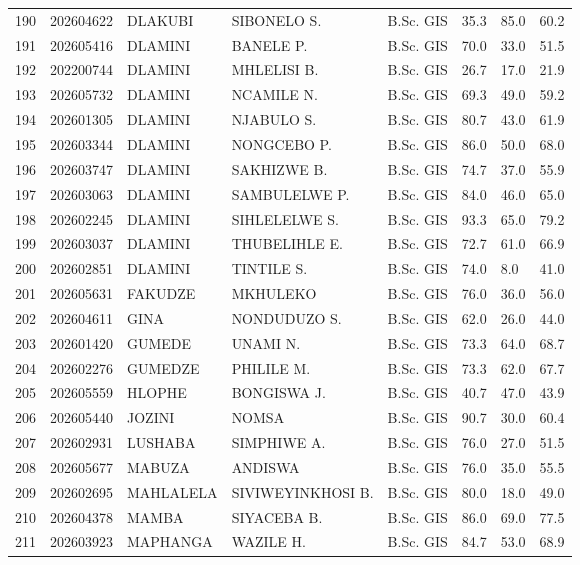 \documentclass[12pt]{article}
\begin{document}
\begin{longtable}{@{}llllllll@{}}
190 & 202604622 & DLAKUBI & SIBONELO S. & B.Sc. GIS & 35.3 & 85.0 & 60.2 \\
191 & 202605416 & DLAMINI & BANELE P. & B.Sc. GIS & 70.0 & 33.0 & 51.5 \\
192 & 202200744 & DLAMINI & MHLELISI B. & B.Sc. GIS & 26.7 & 17.0 & 21.9 \\
193 & 202605732 & DLAMINI & NCAMILE N. & B.Sc. GIS & 69.3 & 49.0 & 59.2 \\
194 & 202601305 & DLAMINI & NJABULO S. & B.Sc. GIS & 80.7 & 43.0 & 61.9 \\
195 & 202603344 & DLAMINI & NONGCEBO P. & B.Sc. GIS & 86.0 & 50.0 & 68.0 \\
196 & 202603747 & DLAMINI & SAKHIZWE B. & B.Sc. GIS & 74.7 & 37.0 & 55.9 \\
197 & 202603063 & DLAMINI & SAMBULELWE P. & B.Sc. GIS & 84.0 & 46.0 & 65.0 \\
198 & 202602245 & DLAMINI & SIHLELELWE S. & B.Sc. GIS & 93.3 & 65.0 & 79.2 \\
199 & 202603037 & DLAMINI & THUBELIHLE E. & B.Sc. GIS & 72.7 & 61.0 & 66.9 \\
200 & 202602851 & DLAMINI & TINTILE S. & B.Sc. GIS & 74.0 & 8.0 & 41.0 \\
201 & 202605631 & FAKUDZE & MKHULEKO & B.Sc. GIS & 76.0 & 36.0 & 56.0 \\
202 & 202604611 & GINA & NONDUDUZO S. & B.Sc. GIS & 62.0 & 26.0 & 44.0 \\
203 & 202601420 & GUMEDE & UNAMI N. & B.Sc. GIS & 73.3 & 64.0 & 68.7 \\
204 & 202602276 & GUMEDZE & PHILILE M. & B.Sc. GIS & 73.3 & 62.0 & 67.7 \\
205 & 202605559 & HLOPHE & BONGISWA J. & B.Sc. GIS & 40.7 & 47.0 & 43.9 \\
206 & 202605440 & JOZINI & NOMSA & B.Sc. GIS & 90.7 & 30.0 & 60.4 \\
207 & 202602931 & LUSHABA & SIMPHIWE A. & B.Sc. GIS & 76.0 & 27.0 & 51.5 \\
208 & 202605677 & MABUZA & ANDISWA & B.Sc. GIS & 76.0 & 35.0 & 55.5 \\
209 & 202602695 & MAHLALELA & SIVIWEYINKHOSI B. & B.Sc. GIS & 80.0 & 18.0 & 49.0 \\
210 & 202604378 & MAMBA & SIYACEBA B. & B.Sc. GIS & 86.0 & 69.0 & 77.5 \\
211 & 202603923 & MAPHANGA & WAZILE H. & B.Sc. GIS & 84.7 & 53.0 & 68.9 \\

\end{longtable}
\end{document}
